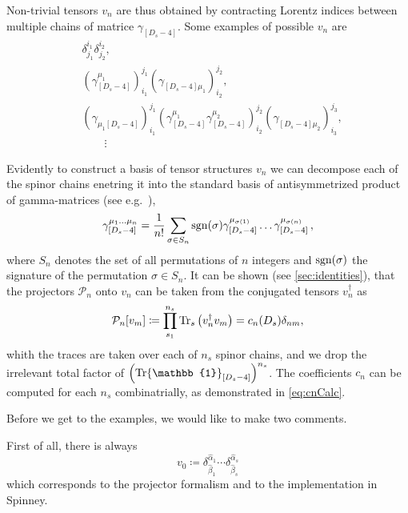 Non-trivial tensors $v_n$ are thus obtained by contracting
Lorentz indices between multiple chains of  matrice $\gamma_{[D_s-4]}$.
Some examples of possible $v_n$ are
\begin{equation}
  \begin{aligned}
    & \delta^{i_1}_{j_1} \delta^{i_2}_{j_2},\\
    & (\gamma_{[D_s-4]}^{\mu_1} )_{i_1}^{j_1} (\gamma_{[D_s-4]\mu_1}^{\phantom{\mu}})_{i_2}^{j_2}, \\
    & (\gamma_{\mu_1[D_s-4]}^{\phantom{\mu}} )_{i_1}^{j_1} (\gamma_{[D_s-4]}^{\mu_1}\gamma_{[D_s-4]}^{\mu_2} )_{i_2}^{j_2} (\gamma_{[D_s-4]\mu_2}^{\phantom{\mu}})_{i_3}^{j_3},\\
    & \qquad \vdots{}
  \end{aligned}
\end{equation}

Evidently to construct a basis of tensor structures $v_n$ we can decompose each of the spinor chains enetring it
into the standard basis of antisymmetrized product of gamma-matrices (see e.g.\ \cite{Veltman:1988au}),
\begin{align}\label{eq:basisGammaChainDs}
\gamma_{[D_s-4]}^{\mu_1 \ldots \mu_n} = \frac{1}{n!} \sum_{ \sigma\in S_n} \operatorname{sgn}(\sigma) \gamma_{[D_s-4]}^{\mu_{\sigma(1)}} \ldots \gamma_{[D_s-4]}^{\mu_{\sigma(n)}}\,,
\end{align}
where $S_n$ denotes the set of all permutations of $n$
integers and $\operatorname{sgn}(\sigma)$ the signature of the permutation
$\sigma\in S_n$.
It can be shown (see \cref{sec:identities}), that the
projectors $\mathcal{P}_n$ onto $v_n$ can be taken from the conjugated tensors $v_n^\dagger$ as
\begin{align} \label{eq:dsm_4_projectors}
  \mathcal{P}_n [v_m] \coloneqq \prod_{s_1}^{n_s} \Tr_s \qty(v_n^\dagger v_m) = c_n(D_s) \delta_{n m},  %
\end{align}
whith the traces are taken over each of $n_s$ spinor chains, and we drop the irrelevant total factor of $\qty(\Tr\mathbb{1}_{[D_s -4 ]})^{n_s}$.
The coefficients $c_n$ can be computed for each $n_s$ combinatrially, as demonstrated in \cref{eq:cnCalc}.

Before we get to the examples, we would like to make two comments.

First of all, there is always 
\begin{equation}
  v_0 \coloneqq \delta^{\hat{\alpha}_1}_{\hat{\beta}_1} \cdots \delta^{\hat{\alpha}_s}_{\hat{\beta}_s}
\end{equation}
which corresponds to the projector formalism and to the implementation in Spinney.

